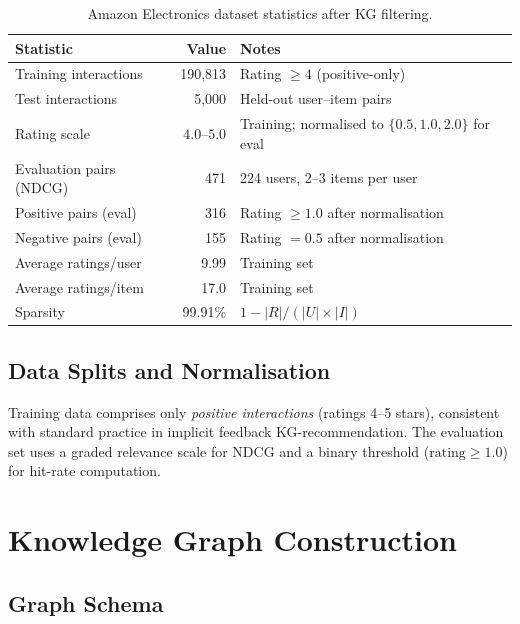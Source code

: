 \documentclass[12pt,a4paper]{article}
\begin{document}
\begin{table}[h]
\centering
\caption{Amazon Electronics dataset statistics after KG filtering.}
\label{tab:dataset-stats}
\begin{tabular}{lrl}
\toprule
\textbf{Statistic} & \textbf{Value} & \textbf{Notes} \\
\midrule
Training interactions   & 190,813   & Rating $\geq 4$ (positive-only) \\
Test interactions       & 5,000     & Held-out user--item pairs \\
Rating scale            & $4.0$--$5.0$ & Training; normalised to $\{0.5, 1.0, 2.0\}$ for eval \\
Evaluation pairs (NDCG) & 471       & 224 users, 2--3 items per user \\
Positive pairs (eval)   & 316       & Rating $\geq 1.0$ after normalisation \\
Negative pairs (eval)   & 155       & Rating $= 0.5$ after normalisation \\
\midrule
Average ratings/user    & 9.99      & Training set \\
Average ratings/item    & 17.0      & Training set \\
Sparsity                & 99.91\%   & $1 - |R| / (|U| \times |I|)$ \\
\bottomrule
\end{tabular}
\end{table}

\subsection{Data Splits and Normalisation}

Training data comprises only \emph{positive interactions} (ratings 4--5 stars),
consistent with standard practice in implicit feedback KG-recommendation.
The evaluation set uses a graded relevance scale for NDCG and a binary threshold
($\text{rating} \geq 1.0$) for hit-rate computation.

\section{Knowledge Graph Construction}
\label{sec:kg}

\subsection{Graph Schema}
\end{document}
